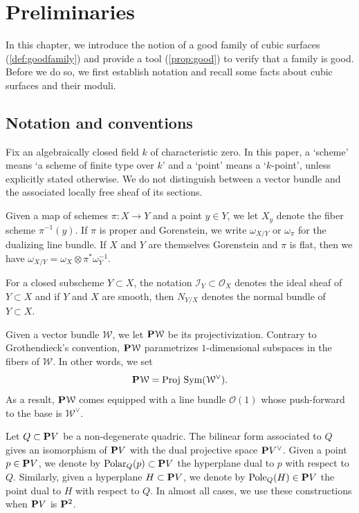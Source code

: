 \documentclass[11pt,reqno, letterpaper]{amsart}
\renewcommand{\k}{k}
\DeclareMathOperator{\Polar}{Polar}
\DeclareMathOperator{\Pole}{Pole}
\renewcommand{\to}{{\longrightarrow}}
\numberwithin{equation}{section}
\renewcommand{\O}{\mathcal O}
\newcommand{\Proj}{{\text{\rm Proj}\,}}
\begin{document}
  




\section{Preliminaries}
\label{sec:good}

In this chapter, we introduce the notion of a good family of cubic
surfaces (\autoref{def:goodfamily}) and provide a tool
(\autoref{prop:good}) to verify that a family is good.  Before we do
so, we first establish notation and recall some facts about cubic surfaces and their moduli.
\subsection{Notation and conventions}
\label{sec:notation-conventions}
Fix an algebraically closed field $\k$ of characteristic zero.  In
this paper, a `scheme' means `a scheme of finite type over $\k$' and a
`point' means a `$\k$-point', unless explicitly stated otherwise.  We
do not distinguish between a vector bundle and the associated locally
free sheaf of its sections.

Given a map of schemes $\pi \colon X \to Y$ and a point $y \in Y$, we
let $X_y$ denote the fiber scheme $\pi^{-1}(y)$.  If $\pi$ is proper
and Gorenstein, we write $\omega_{X/Y}$ or $\omega_\pi$ for the
dualizing line bundle.  If $X$ and $Y$ are themselves Gorenstein and
$\pi$ is flat, then we have
$\omega_{X/Y} = \omega_X \otimes \pi^*\omega_Y^{-1}$.

For a closed subscheme $Y \subset X$, the notation $\mathcal I_Y \subset \O_X$ denotes the ideal sheaf of $Y \subset X$ and if $Y$ and $X$ are smooth, then $N_{Y/X}$ denotes the normal bundle of $Y \subset X$.

Given a vector bundle $\mathcal W$, we let $\P \mathcal W$ be its
projectivization.  Contrary to Grothendieck's convention,
$\P \mathcal W$ parametrizes $1$-dimensional subspaces in the fibers
of $\mathcal W$.  In other words, we set
\[ \P \mathcal W = \Proj \Sym(\mathcal W^\vee).\] As a result,
$\P \mathcal W$ comes equipped with a line bundle $\O(1)$ whose
push-forward to the base is $\mathcal W^\vee$.

Let $Q \subset \P V$ be a non-degenerate quadric.  The bilinear form
associated to $Q$ gives an isomorphism of $\P V$ with the dual
projective space $\P V^\vee$.  Given a point $p \in \P V$, we denote
by $\Polar_Q(p) \subset \P V$ the hyperplane dual to $p$ with respect to
$Q$. Similarly, given a hyperplane $H \subset \P V$, we denote by
$\Pole_Q(H) \in \P V$ the point dual to $H$ with respect to $Q$.  In
almost all cases, we use these constructions when $\P V$ is $\P^2$.
\end{document}
